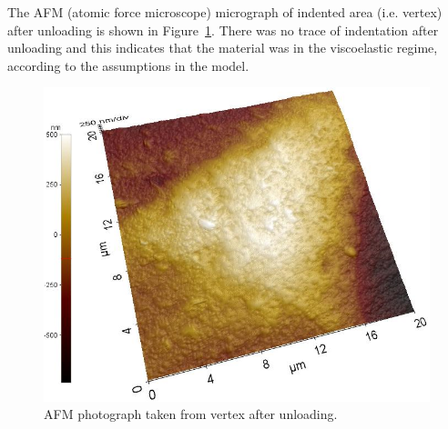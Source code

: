 \documentclass[review]{elsarticle}
\begin{document}
The AFM (atomic force microscope) micrograph of indented area (i.e. vertex) after unloading is shown in Figure~\ref{fig:AFM}. There was no trace of indentation after unloading and this indicates that the material was in the viscoelastic regime, according to the assumptions in the model. 
\begin{figure}[hb]
  \centering
  \includegraphics[scale=0.5]{AFM}
  \captionsetup{justification=centering}
  \caption[Close up of \textit{Hemidactylus} sp. ]
   {AFM photograph taken from vertex after unloading.}
  \label{fig:AFM}
\end{figure}
\end{document}
